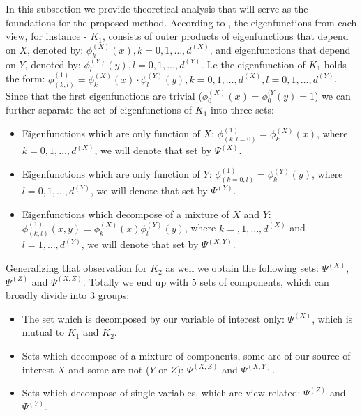 \documentclass[]{article}
\theoremstyle{definition}
\begin{document}
	In this subsection we provide theoretical analysis that will serve as the foundations for the proposed method.
	According to \cite[equation 3.11]{singer2006spectral}, the eigenfunctions from each view, for instance - $K_1$, consists of outer products of eigenfunctions that depend on $X$, denoted by: $\phi^{(X)}_k(x), k=0,1,\ldots,d^{(X)}$, and eigenfunctions that depend on $Y$, denoted by: $\phi^{(Y)}_l(y), l=0,1,\ldots,d^{(Y)}$. I.e the eigenfunction of $K_1$ holds the form:
	$\phi^{(1)}_{(k,l)} = \phi^{(X)}_k(x) \cdot \phi^{(Y)}_l(y), k=0,1,\ldots,d^{(X)}, l=0,1,\ldots,d^{(Y)}$.
	Since that the first eigenfunctions are trivial ($\phi^{(X)}_0(x)=\phi^{(Y}_0(y) = 1$) we can further separate the set of eigenfunctions of $K_1$ into three sets:
	\begin{itemize}
		\item Eigenfunctions which are only function of $X$: $\phi^{(1)}_{(k,l=0)} = \phi^{(X)}_k(x)$, where $k=0,1,\ldots,d^{(X)}$, we will denote that set by $\Psi^{(X)}$.
		\item Eigenfunctions which are only function of $Y$: $\phi^{(1)}_{(k=0,l)} = \phi^{(Y)}_k(y)$, where $l=0,1,\ldots,d^{(Y)}$,
		we will denote that set by $\Psi^{(Y)}$.
		\item Eigenfunctions which decompose of a mixture of $X$ and $Y$: $\phi^{(1)}_{(k,l)}(x,y) = \phi^{(X)}_k(x) \phi^{(Y)}_l(y)$, where $k=,1,\ldots,d^{(X)}$ and  $l=1,\ldots,d^{(Y)}$, we will denote that set by $\Psi^{(X,Y)}$.
	\end{itemize}
	Generalizing that observation for $K_2$ as well we obtain the following sets: $\Psi^{(X)}$, $\Psi^{(Z)}$ and $\Psi^{(X,Z)}$.
	Totally we end up with $5$ sets of components, which can broadly divide into $3$ groups:
	\begin{itemize}
		\item The set which is decomposed by our variable of interest only: $\Psi^{(X)}$, which is mutual to $K_1$ and $K_2$.
		\item Sets which decompose of a mixture of components, some are of our source of interest $X$ and some are not ($Y$ or $Z$): $\Psi^{(X,Z)}$ and $\Psi^{(X,Y)}$.
		\item Sets which decompose of single variables, which are view related: $\Psi^{(Z)}$ and $\Psi^{(Y)}$.
	\end{itemize}
\end{document}
